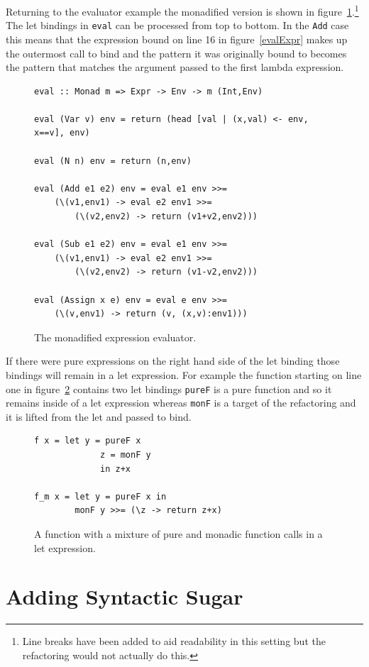 Returning to the evaluator example the monadified version is shown in figure~\ref{monEval}.\footnote{Line breaks have been added to aid readability in this setting but the refactoring would not actually do this.} The let bindings in \texttt{eval} can be processed from top to bottom. In the \texttt{Add} case this means that the expression bound on line 16 in figure~\ref{evalExpr} makes up the outermost call to bind and the pattern it was originally bound to becomes the pattern that matches the argument passed to the first lambda expression. 
\begin{figure}[t]
\begin{lstlisting}
eval :: Monad m => Expr -> Env -> m (Int,Env)

eval (Var v) env = return (head [val | (x,val) <- env, x==v], env)

eval (N n) env = return (n,env)

eval (Add e1 e2) env = eval e1 env >>= 
	(\(v1,env1) -> eval e2 env1 >>= 
		(\(v2,env2) -> return (v1+v2,env2)))

eval (Sub e1 e2) env = eval e1 env >>= 
	(\(v1,env1) -> eval e2 env1 >>= 
		(\(v2,env2) -> return (v1-v2,env2)))

eval (Assign x e) env = eval e env >>= 
	(\(v,env1) -> return (v, (x,v):env1)))
\end{lstlisting}
\caption{The monadified expression evaluator.}
\label{monEval}
\end{figure}

If there were pure expressions on the right hand side of the let binding those bindings will remain in a let expression. For example the function starting on line one in figure~\ref{mixLet} contains two let bindings \texttt{pureF} is a pure function and so it remains inside of a let expression whereas \texttt{monF} is a target of the refactoring and it is lifted from the let and passed to bind. 

\begin{figure}[t]
\begin{lstlisting}
f x = let y = pureF x
             z = monF y
		     in z+x

f_m x = let y = pureF x in
		monF y >>= (\z -> return z+x)
\end{lstlisting}
\caption{A function with a mixture of pure and monadic function calls in a let expression.}
\label{mixLet}
\end{figure}

\section{Adding Syntactic Sugar}

